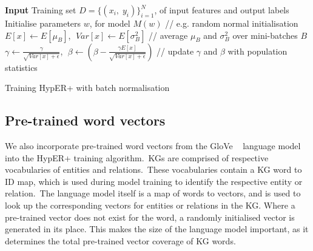 \begin{algorithm}
	\SetAlgoLined
	\textbf{Input} 
	Training set $ D = \{(x_i, \; y_i)\}_{i=1}^N $, of input features and output labels \\
	Initialise parameters $ w $, for model $ M(w) $ // e.g. random normal initialisation \\
	$ E[x] \gets E[\mu_B] $, $ \; Var[x] \gets E[\sigma_B^2] $ // average $ \mu_B $ and $ \sigma_B^2 $ over mini-batches $ B $ \\
	$ \gamma \gets \frac{\gamma}{\sqrt{Var[x] + \epsilon}} $, $ \; \beta \gets \left(\beta - \frac{\gamma E[x]}{\sqrt{Var[x] + \epsilon}} \right) $ // update $ \gamma $ and $ \beta $ with population statistics
	\caption{Training HypER+ with batch normalisation}
\end{algorithm} 
 
\subsection{Pre-trained word vectors}

We also incorporate pre-trained word vectors from the GloVe \unskip ~\citep{pennington2014glove} language model into the HypER+ training algorithm.\ KGs are comprised of respective vocabularies of entities and relations.\ These vocabularies contain a KG word to ID map, which is used during model training to identify the respective entity or relation.\ The language model itself is a map of words to vectors, and is used to look up the corresponding vectors for entities or relations in the KG. Where a pre-trained vector does not exist for the word, a randomly initialised vector is generated in its place. This makes the size of the language model important, as it determines the total pre-trained vector coverage of KG words.\par

